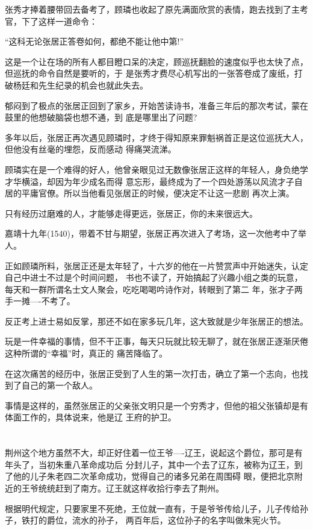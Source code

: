 \documentclass[11pt,a4paper,onecolumn]{article}
\begin{document}
张秀才捧着腰带回去备考了，顾璘也收起了原先满面欣赏的表情，跑去找到了主考官，下了这样一道命令：

``这科无论张居正答卷如何，都绝不能让他中第!''

这是一个让在场的所有人都目瞪口呆的决定，顾巡抚翻脸的速度似乎也太快了点，但巡抚的命令自然是要听的，于
是张秀才费尽心机写出的一张答卷成了废纸，打破杨廷和先生纪录的机会也就此失去。

郁闷到了极点的张居正回到了家乡，开始苦读诗书，准备三年后的那次考试，蒙在鼓里的他想破脑袋也想不通，到
底是哪里出了问题?

多年以后，张居正再次遇见顾璘时，才终于得知原来罪魁祸首正是这位巡抚大人，但他没有丝毫的埋怨，反而感动
得痛哭流涕。

顾璘实在是一个难得的好人，他曾亲眼见过无数像张居正这样的年轻人，身负绝学才华横溢，却因为年少成名而得
意忘形，最终成为了一个四处游荡以风流才子自居的平庸官僚。所以当他看见张居正的时候，便决定不让这一悲剧
再次上演。

只有经历过磨难的人，才能够走得更远，张居正，你的未来很远大。

嘉靖十九年(1540)，带着不甘与期望，张居正再次进入了考场，这一次他考中了举人。

正如顾璘所料，张居正还是太年轻了，十六岁的他在一片赞赏声中开始迷失，认定自己中进士不过是个时间问题，
书也不读了，开始搞起了兴趣小组之类的玩意，每天和一群所谓名士文人聚会，吃吃喝喝吟诗作对，转眼到了第二
年，张才子两手一摊----不考了。

反正考上进士易如反掌，那还不如在家多玩几年，这大致就是少年张居正的想法。

玩是一件幸福的事情，但不干正事，每天只玩就比较无聊了，就在张居正逐渐厌倦这种所谓的``幸福''时，真正的
痛苦降临了。

在这次痛苦的经历中，张居正受到了人生的第一次打击，确立了第一个志向，也找到了自己的第一个敌人。

事情是这样的，虽然张居正的父亲张文明只是一个穷秀才，但他的祖父张镇却是有体面工作的，具体说来，他是辽
王府的护卫。

\section[\thesection]{}

荆州这个地方虽然不大，却正好住着一位王爷----辽王，说起这个爵位，那可是有年头了，当初朱重八革命成功后
分封儿子，其中一个去了辽东，被称为辽王，到了他的儿子朱老四二次革命成功，觉得自己的诸多兄弟在周围碍
眼，便把北京附近的王爷统统赶到了南方。辽王就这样收拾行李去了荆州。

根据明代规定，只要家里不死绝，王位就一直有，于是爷爷传给儿子，儿子传给孙子，铁打的爵位，流水的孙子，
两百年后，这位孙子的名字叫做朱宪火节。
\end{document}
